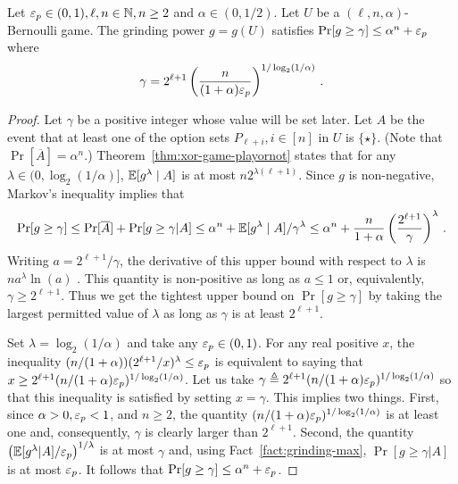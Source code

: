     \begin{lemma}\label{lemma:xor-game-Bernoulli-gamma}
        Let $\mathsf{\varepsilon}_p \in (0,1), \ell, n \in \mathbb{N}, n \geq 2$ and 
        $\alpha \in (0, 1/2)$.
        Let $U$ be a $(\ell, n, \alpha)$-Bernoulli game. 
        The grinding power $g = g(U)$ 
        satisfies $\Pr[g \geq \gamma] \leq \alpha^n + \mathsf{\varepsilon}_p$ where 
        \begin{align}\label{eq:bernoulli-game-gamma}
            \gamma = 2^{\ell + 1} \left(
                \frac{n}{(1+\alpha)\mathsf{\varepsilon}_p}
            \right)^{1/\log_2(1/\alpha)}
            \,.
        \end{align}
    \end{lemma}
    \begin{proof}
        Let $\gamma$ be a positive integer whose value will be set later.
        Let $A$ be the event that 
        at least one of the option sets $P_{\ell + i}, i \in [n]$ in $U$ is $\{\star\}$. 
        (Note that $\Pr[\overline{A}] = \alpha^n$.)
        Theorem~\ref{thm:xor-game-playornot} states that 
        for any $\lambda \in (0, \log_2(1/\alpha)]$, 
        $\operatorname{\mathbb{E}} [g^\lambda \mid A]$ is at most $n 2^{\lambda(\ell + 1)}$. 
        Since $g$ is non-negative, 
        Markov's inequality implies that 
        $$
        \Pr[g \geq \gamma] 
        \leq \Pr[\overline{A}] + \Pr[g \geq \gamma | A]
        \leq \alpha^n  + \operatorname{\mathbb{E}}[g^\lambda \mid A]/\gamma^\lambda
        \leq \alpha^n  + \frac{n}{1+\alpha} 
            \left(\frac{2^{\ell + 1}}{\gamma}\right)^\lambda
        \,.$$ 
        Writing $a = 2^{\ell + 1}/\gamma$, 
        the derivative of this upper bound with respect to $\lambda$ is 
        $n a^\lambda \ln(a)$ . 
        This quantity is non-positive as long as $a \leq 1$ or, equivalently, 
        $\gamma \geq 2^{\ell + 1}$. 
        Thus we get the tightest upper bound on $\Pr[g \geq \gamma]$ 
        by taking the largest permitted value of $\lambda$ 
        as long as $\gamma$ is at least $2^{\ell + 1}$. 
        
        Set $\lambda = \log_2(1/\alpha)$ and take any $\mathsf{\varepsilon}_p \in (0,1)$. 
        For any real positive $x$, 
        the inequality $(n/(1+\alpha)) (2^{\ell + 1}/x)^\lambda \leq \mathsf{\varepsilon}_p$ 
        is equivalent to saying that 
        $x \geq 2^{\ell + 1} (n/(1+\alpha)\mathsf{\varepsilon}_p)^{1/\log_2(1/\alpha)}$. 
        Let us take 
        $\gamma \triangleq 2^{\ell + 1} (n/(1+\alpha)\mathsf{\varepsilon}_p)^{1/\log_2(1/\alpha)}$ 
        so that this inequality is satisfied by setting $x = \gamma$. 
        This implies two things. 
        First, 
        since $\alpha > 0, \mathsf{\varepsilon}_p < 1$, and $n \geq 2$, 
        the quantity  $(n/(1+\alpha)\mathsf{\varepsilon}_p)^{1/\log_2(1/\alpha)}$ is at least one and, consequently, 
        $\gamma$ is clearly larger than $2^{\ell + 1}$. 
        Second, 
        the quantity 
        $\left( \operatorname{\mathbb{E}}[g^\lambda | A]/\mathsf{\varepsilon}_p \right)^{1/\lambda}$ is at most $\gamma$ 
        and, using Fact~\ref{fact:grinding-max}, 
        $\Pr[g \geq \gamma | A]$ is at most $\mathsf{\varepsilon}_p$. 
        It follows that $\Pr[g \geq \gamma] \leq \alpha^n + \mathsf{\varepsilon}_p$.
    \end{proof}



